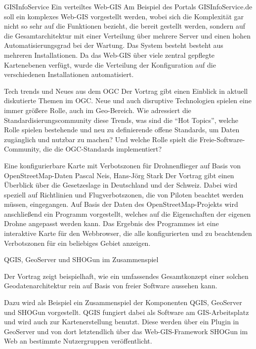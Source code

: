 %
{GISInfoService}%
{Ein verteiltes Web-GIS}%
{%
Am Beispiel des Portals GISInfoService.de soll ein komplexes Web-GIS
vorgestellt werden, wobei sich die Komplexität gar nicht so sehr auf die
Funktionen bezieht, die bereit gestellt werden, sondern auf die
Gesamtarchitektur mit einer Verteilung über mehrere Server und einen hohen
Automatisierungsgrad bei der Wartung. Das System besteht besteht aus mehreren
Installationen. Da das Web-GIS über viele zentral gepflegte Kartenebenen
verfügt, wurde die Verteilung der Konfiguration auf die verschiedenen
Installationen automatisiert.%
}

%
{Tech trends und Neues aus dem OGC}%
{}%
{%
Der Vortrag gibt einen Einblick in aktuell diskutierte Themen im OGC. Neue und
auch disruptive Technologien spielen eine immer größere Rolle, auch im
Geo-Bereich. Wie adressiert die Standardisierungscommunity diese Trends, was
sind die "`Hot Topics"', welche Rolle spielen bestehende und neu zu
definierende offene Standards, um Daten zugänglich und nutzbar zu machen? Und
welche Rolle spielt die Freie-Software-Community, die die OGC-Standards
implementiert?%
}

%
{Eine konfigurierbare Karte mit Verbotszonen für Drohnenflieger auf Basis von OpenStreetMap-Daten}%
{Pascal Neis, Hans-Jörg Stark}%
{%
Der Vortrag gibt einen Überblick über die Gesetzeslage in Deutschland und der
Schweiz. Dabei wird speziell auf Richtlinien und Flugverbotszonen, die von
Piloten beachtet werden müssen, eingegangen. Auf Basis der Daten des
OpenStreetMap-Projekts wird anschließend ein Programm vorgestellt, welches auf
die Eigenschaften der eigenen Drohne angepasst werden kann. Das Ergebnis des
Programmes ist eine interaktive Karte für den Webbrowser, die alle
konfigurierten und zu beachtenden Verbotszonen für ein beliebiges Gebiet
anzeigen.%
}

%
{QGIS, GeoServer und SHOGun im Zusammenspiel}%
{}%
{%
Der Vortrag zeigt beispielhaft, wie ein umfassendes Gesamtkonzept einer solchen
Geodatenarchitektur rein auf Basis von freier Software aussehen kann. 

Dazu wird als Beispiel ein Zusammenspiel der Komponenten QGIS, GeoServer und
SHOGun vorgestellt. QGIS fungiert dabei als Software am GIS-Arbeitsplatz und
wird auch zur Kartenerstellung benutzt. Diese werden über ein Plugin in
GeoServer und von dort letztendlich über das Web-GIS-Framework SHOGun im Web an
bestimmte Nutzergruppen veröffentlicht.%
}

